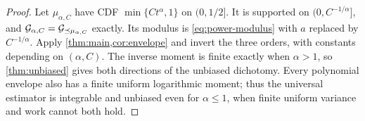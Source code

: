 \begin{proof}
Let $\mu_{\alpha,C}$ have CDF $\min\{Ct^\alpha,1\}$ on $(0,1/2]$.
It is supported on $(0,C^{-1/\alpha}]$, and
$\mathcal G_{\alpha,C}=\mathcal G_{\preceq\mu_{\alpha,C}}$ exactly.
Its modulus is \eqref{eq:power-modulus} with $a$ replaced by
$C^{-1/\alpha}$. Apply \cref{thm:main,cor:envelope} and invert the three
orders, with constants depending on $(\alpha,C)$.
The inverse moment is finite exactly when $\alpha>1$, so
\cref{thm:unbiased} gives both directions of the unbiased dichotomy.
Every polynomial envelope also has a finite uniform logarithmic moment;
thus the universal estimator is integrable and unbiased even for
$\alpha\le1$, when finite uniform variance and work cannot both hold.
\end{proof}

